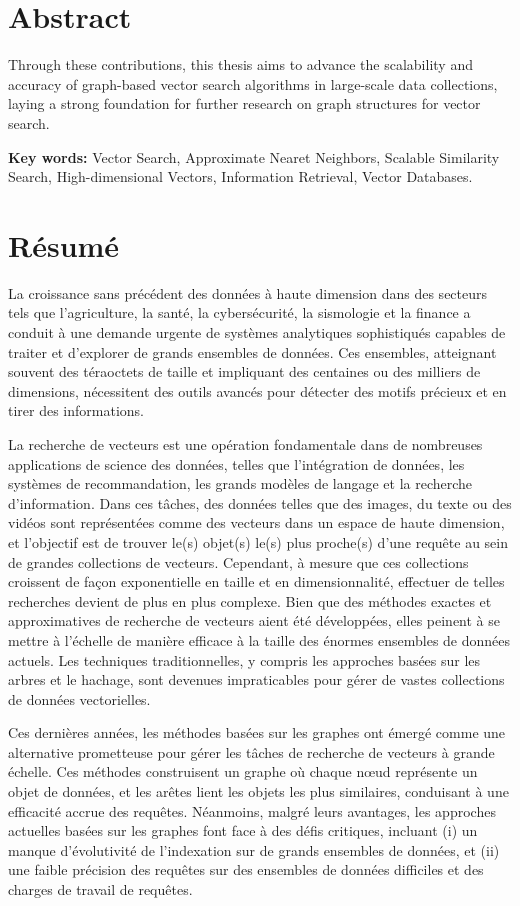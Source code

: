 \documentclass[12pt]{thesis}
\newenvironment{abstractenglish}{
    \selectlanguage{english}
    \chapter*{Abstract}
}{
}
\newenvironment{abstractfrench}{
    \selectlanguage{french}
    \chapter*{Résumé}
}{
}
\begin{document}
\begin{preliminary}
\begin{abstractenglish}
Through these contributions, this thesis aims to advance the scalability and accuracy of graph-based vector search algorithms in large-scale data collections, laying a strong foundation for further research on graph structures for vector search.

\textbf{Key words:} Vector Search, Approximate Nearet Neighbors, Scalable Similarity Search, High-dimensional Vectors, Information Retrieval, Vector Databases.
\end{abstractenglish}

\newpage

\begin{abstractfrench}
La croissance sans précédent des données à haute dimension dans des secteurs tels que l'agriculture, la santé, la cybersécurité, la sismologie et la finance a conduit à une demande urgente de systèmes analytiques sophistiqués capables de traiter et d'explorer de grands ensembles de données. Ces ensembles, atteignant souvent des téraoctets de taille et impliquant des centaines ou des milliers de dimensions, nécessitent des outils avancés pour détecter des motifs précieux et en tirer des informations.

La recherche de vecteurs est une opération fondamentale dans de nombreuses applications de science des données, telles que l'intégration de données, les systèmes de recommandation, les grands modèles de langage et la recherche d'information. Dans ces tâches, des données telles que des images, du texte ou des vidéos sont représentées comme des vecteurs dans un espace de haute dimension, et l'objectif est de trouver le(s) objet(s) le(s) plus proche(s) d'une requête au sein de grandes collections de vecteurs. Cependant, à mesure que ces collections croissent de façon exponentielle en taille et en dimensionnalité, effectuer de telles recherches devient de plus en plus complexe. Bien que des méthodes exactes et approximatives de recherche de vecteurs aient été développées, elles peinent à se mettre à l'échelle de manière efficace à la taille des énormes ensembles de données actuels. Les techniques traditionnelles, y compris les approches basées sur les arbres et le hachage, sont devenues impraticables pour gérer de vastes collections de données vectorielles.

Ces dernières années, les méthodes basées sur les graphes ont émergé comme une alternative prometteuse pour gérer les tâches de recherche de vecteurs à grande échelle. Ces méthodes construisent un graphe où chaque nœud représente un objet de données, et les arêtes lient les objets les plus similaires, conduisant à une efficacité accrue des requêtes. Néanmoins, malgré leurs avantages, les approches actuelles basées sur les graphes font face à des défis critiques, incluant (i) un manque d'évolutivité de l'indexation sur de grands ensembles de données, et (ii) une faible précision des requêtes sur des ensembles de données difficiles et des charges de travail de requêtes.


\end{abstractfrench}
\end{preliminary}
\end{document}
